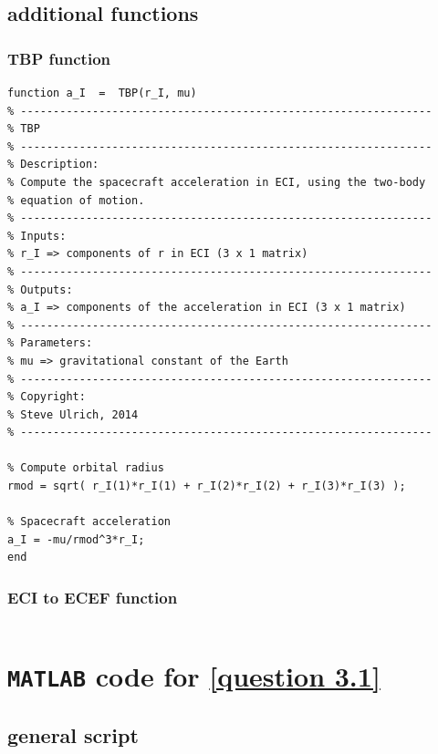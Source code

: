 \documentclass[hidelinks, 12pt]{article}%
\begin{document}
\begin{appendices}
\subsection{additional functions}
\subsubsection{TBP function}

\begin{verbatim}
function a_I  =  TBP(r_I, mu)
% ---------------------------------------------------------------
% TBP
% ---------------------------------------------------------------
% Description:
% Compute the spacecraft acceleration in ECI, using the two-body
% equation of motion.
% ---------------------------------------------------------------
% Inputs:
% r_I => components of r in ECI (3 x 1 matrix)
% ---------------------------------------------------------------
% Outputs:
% a_I => components of the acceleration in ECI (3 x 1 matrix)
% ---------------------------------------------------------------
% Parameters:
% mu => gravitational constant of the Earth
% ---------------------------------------------------------------
% Copyright:
% Steve Ulrich, 2014 
% ---------------------------------------------------------------

% Compute orbital radius
rmod = sqrt( r_I(1)*r_I(1) + r_I(2)*r_I(2) + r_I(3)*r_I(3) );

% Spacecraft acceleration
a_I = -mu/rmod^3*r_I; 
end
 \end{verbatim}  
                
\subsubsection{ECI to ECEF function}
\inputminted[]{Matlab}{output_files/2.13/r_I2r_F.m}


\section{\texttt{MATLAB} code for \ref{question 3.1}}
\label{3.1 appendix}
\subsection{general script}
\inputminted[mathescape=true]{Matlab}{output_files/3.1/PROBA2_Chapter3.m}


\end{appendices}
\end{document}
